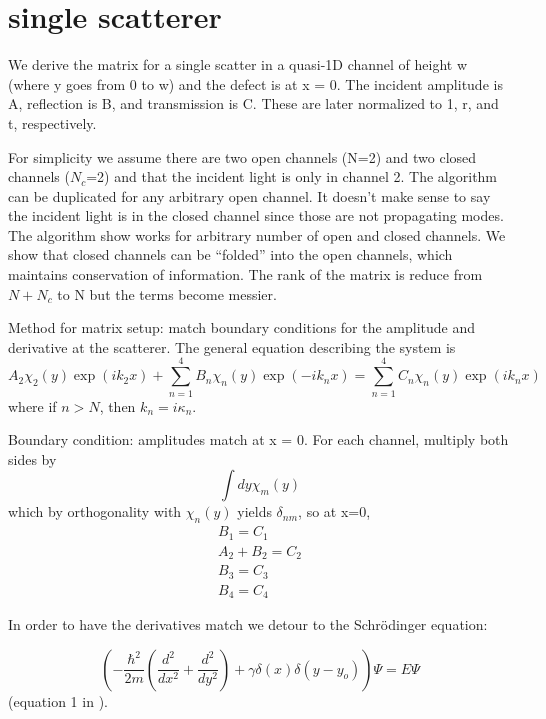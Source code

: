 \section{single scatterer}

We derive the matrix for a single scatter in a quasi-1D channel of height w (where y goes from 0 to w) and the defect is at x = 0. The incident amplitude is A, reflection is B, and transmission is C.  These are later normalized to 1, r, and t, respectively.

For simplicity we assume there are two open channels (N=2) and two closed channels ($N_c$=2) and that the incident light is only in channel 2. The algorithm can be duplicated for any arbitrary open channel. It doesn't make sense to say the incident light is in the closed channel since those are not propagating modes. The algorithm show works for arbitrary number of open and closed channels. We show that closed channels can be ``folded'' into the open channels, which maintains conservation of information. The rank of the matrix is reduce from $N+N_c$ to N but the terms become messier.

Method for matrix setup: match boundary conditions for the amplitude and derivative at the scatterer.
The general equation describing the system is
\begin{equation}
A_2 \chi_2(y) \exp(i k_2 x) + \sum_{n=1}^4 B_n \chi_n(y) \exp(-i k_n x) = 
\sum_{n=1}^4 C_n \chi_n(y) \exp(i k_n x)
\label{singlescattererwave}
\end{equation}
where if $n>N$, then $k_n = i \kappa_n$.

Boundary condition: amplitudes match at x = 0. For each channel, multiply both sides by
\begin{equation}
\int dy \chi_m(y)
\end{equation}
which by orthogonality with $\chi_n(y)$ yields $\delta_{nm}$, so at x=0,
\begin{equation}
\begin{gathered}
B_1 = C_1 \\
A_2 + B_2 = C_2 \\
B_3 = C_3 \\
B_4 = C_4
\end{gathered}
\end{equation}

In order to have the derivatives match we detour to the Schr\"{o}dinger equation:

\begin{equation}
(-\frac{\hbar^2}{2 m}(\frac{d^2}{dx^2}+\frac{d^2}{dy^2})+\gamma \delta(x)\delta(y-y_o))\Psi = E \Psi
\end{equation}
(equation 1 in \cite{1990_Bagwell}).

